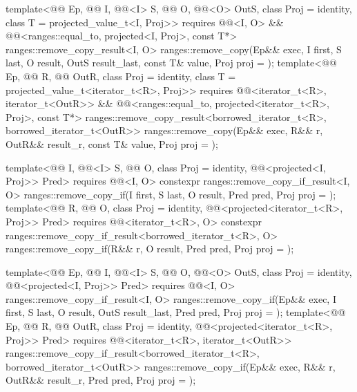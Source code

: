 \begin{itemdecl}
template<@@ Ep, @@ I, @@<I> S,
         @@ O, @@<O> OutS,
         class Proj = identity, class T = projected_value_t<I, Proj>>
  requires @@<I, O> &&
           @@<ranges::equal_to, projected<I, Proj>, const T*>
  ranges::remove_copy_result<I, O>
    ranges::remove_copy(Ep&& exec, I first, S last, O result, OutS result_last,
                        const T& value, Proj proj = {});
template<@@ Ep, @@ R, @@ OutR,
         class Proj = identity, class T = projected_value_t<iterator_t<R>, Proj>>
  requires @@<iterator_t<R>, iterator_t<OutR>> &&
           @@<ranges::equal_to,
                                      projected<iterator_t<R>, Proj>, const T*>
  ranges::remove_copy_result<borrowed_iterator_t<R>, borrowed_iterator_t<OutR>>
    ranges::remove_copy(Ep&& exec, R&& r, OutR&& result_r, const T& value, Proj proj = {});

template<@@ I, @@<I> S, @@ O,
         class Proj = identity, @@<projected<I, Proj>> Pred>
  requires @@<I, O>
  constexpr ranges::remove_copy_if_result<I, O>
    ranges::remove_copy_if(I first, S last, O result, Pred pred, Proj proj = {});
template<@@ R, @@ O, class Proj = identity,
         @@<projected<iterator_t<R>, Proj>> Pred>
  requires @@<iterator_t<R>, O>
  constexpr ranges::remove_copy_if_result<borrowed_iterator_t<R>, O>
    ranges::remove_copy_if(R&& r, O result, Pred pred, Proj proj = {});

template<@@ Ep, @@ I, @@<I> S,
         @@ O, @@<O> OutS,
         class Proj = identity, @@<projected<I, Proj>> Pred>
  requires @@<I, O>
  ranges::remove_copy_if_result<I, O>
    ranges::remove_copy_if(Ep&& exec, I first, S last, O result, OutS result_last,
                           Pred pred, Proj proj = {});
template<@@ Ep, @@ R, @@ OutR,
         class Proj = identity,
         @@<projected<iterator_t<R>, Proj>> Pred>
  requires @@<iterator_t<R>, iterator_t<OutR>>
  ranges::remove_copy_if_result<borrowed_iterator_t<R>, borrowed_iterator_t<OutR>>
    ranges::remove_copy_if(Ep&& exec, R&& r, OutR&& result_r, Pred pred, Proj proj = {});
\end{itemdecl}

